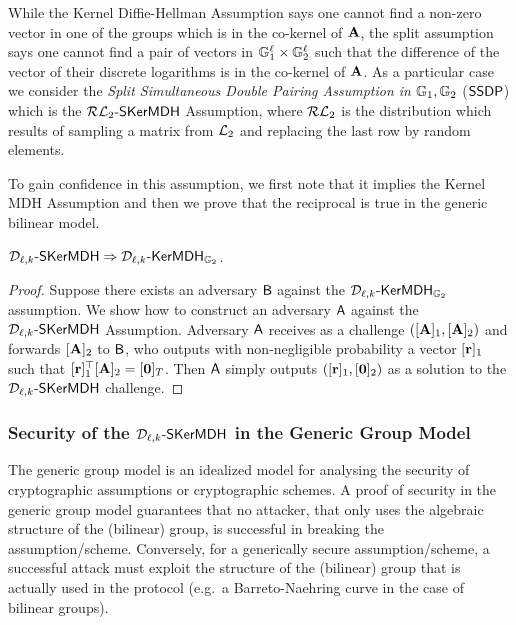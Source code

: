 While the Kernel Diffie-Hellman Assumption says one cannot find a non-zero vector in one of the groups which is in the co-kernel of $\mathbf{{A}}$, the split assumption says one cannot find a pair of vectors in $\mathbb{G}_1^{\ell} \times \mathbb{G}_2^{\ell}$ such that the difference of the vector of their discrete logarithms is in the co-kernel of $\mathbf{{A}}$. 
As a particular case we consider the \emph{Split Simultaneous Double Pairing Assumption in} $\mathbb{G}_1,\mathbb{G}_2$ ($\mathsf{SSDP}$) which is the $\mathcal{RL}_{2}\mbox{-}\mathsf{SKerMDH}$ Assumption, where 
$\mathcal{RL}_{2}$ is the distribution which results of sampling a matrix from $\mathcal{L}_{2}$ and replacing the last row by random elements. 

To gain confidence in this assumption, we first note that it implies the Kernel MDH Assumption and then we prove that the reciprocal is true in the generic bilinear model. 

\begin{lemma} $\mathcal{D}_{\ell,k}\mbox{-}\mathsf{SKerMDH} \Rightarrow \mathcal{D}_{\ell,k}\mbox{-}\mathsf{KerMDH}_{\mathbb{G}_2}$.
\end{lemma}
\begin{proof} Suppose there exists an adversary $\mathsf{B}$ against the 
$\mathcal{D}_{\ell,k}\mbox{-}\mathsf{KerMDH}_{\mathbb{G}_2}$ assumption. We show how to construct an adversary $\mathsf{A}$ against the  $\mathcal{D}_{\ell,k}\mbox{-}\mathsf{SKerMDH}$ Assumption. Adversary $\mathsf{A}$ receives as a challenge $([\mathbf{{A}}]_1,[\mathbf{{A}}]_2)$ and forwards $[\mathbf{{A}}]_2$ to $\mathsf{B}$, who outputs with non-negligible probability a vector $[\mathbf{r}]_1$ such that $[\mathbf{r}]_1^{\top} [\mathbf{{A}}]_2=[\mathbf{0}]_{T}$. Then $\mathsf{A}$  simply outputs $([\mathbf{r}]_1,[\mathbf{0}]_2)$ as a solution to the $\mathcal{D}_{\ell,k}\mbox{-}\mathsf{SKerMDH}$ challenge. 
\end{proof}

\subsubsection{Security of the $\mathcal{D}_{\ell,k}\mbox{-}\mathsf{SKerMDH}$ in the Generic Group Model}

The generic group model is an idealized model for analysing the security of cryptographic assumptions or cryptographic schemes. A proof of security in the generic group model guarantees that no attacker, that only uses the algebraic structure of the (bilinear) group, is successful in breaking the assumption/scheme. Conversely, for a generically secure assumption/scheme, a successful attack must exploit the structure of the (bilinear) group that is actually used in the protocol (e.g.~a Barreto-Naehring curve in the case of bilinear groups).  

